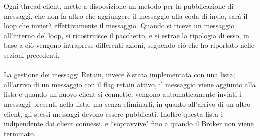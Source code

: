 \documentclass{article}
\begin{document}
Ogni thread client, mette a disposizione un metodo per la pubblicazione di messaggi, che non fa altro che aggiungere il messaggio alla coda di invio, sarà il loop che invierà effettivamente il messaggio. Quando si riceve un messaggio all'interno del loop, si ricostruisce il pacchetto, e si estrae la tipologia di esso, in base a ciò vengono intraprese differenti azioni, seguendo ciò che ho riportato nelle sezioni precedenti.\\\\
La gestione dei messaggi Retain, invece è stata implementata con una lista; all'arrivo di un messaggio con il flag retain attivo, il messaggio viene aggiunto alla lista e quando un'nuovo client si connette, vengono automaticamente inviati i messaggi presenti nella lista, ma senza eliminarli, in quanto all'arrivo di un altro client, gli stessi messaggi devono essere pubblicati. Inoltre questa lista è indipendente dai client connessi, e ``sopravvive" fino a quando il Broker non viene terminato.
\end{document}
